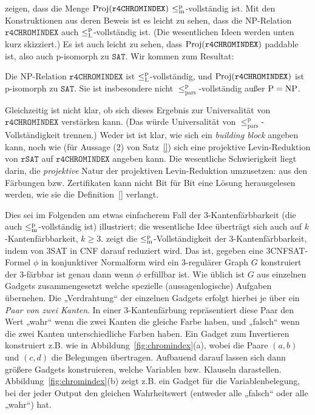\textcite{leven_np_1983} zeigen, dass die Menge $\operatorname{Proj}(\mathtt{r4CHROMINDEX})$ $\leq_\mathrm{m}^\mathrm{p}$-vollständig ist. 
Mit den Konstruktionen aus deren Beweis ist es leicht zu sehen, dass die NP-Relation $\mathtt{r4CHROMINDEX}$ auch $\leq_\mathrm{L}^\mathrm{p}$-vollständig ist. (Die wesentlichen Ideen werden unten kurz skizziert.)
Es ist auch leicht zu sehen, dass $\operatorname{Proj}(\mathtt{r4CHROMINDEX})$ paddable ist, also  auch p-isomorph zu $\mathtt{SAT}$.
Wir kommen zum Resultat:
\begin{observation}
    Die NP-Relation $\mathtt{r4CHROMINDEX}$ ist $\leq_\mathrm{L}^\mathrm{p}$-vollständig, und $\operatorname{Proj}(\mathtt{r4CHROMINDEX})$ ist p-isomorph zu $\mathtt{SAT}$.
    Sie ist insbesondere nicht $\leq_\mathrm{pars}^\mathrm p$-vollständig außer $\mathrm{P}=\mathrm{NP}$.
\end{observation}

Gleichzeitig ist nicht klar, ob sich dieses Ergebnis zur Universalität von $\mathtt{r4CHROMINDEX}$ verstärken kann. (Das würde Universalität von $\leq_\mathrm{pars}^\mathrm p$-Vollständigkeit trennen.) Weder ist ist klar, wie sich ein \emph{building block} angeben kann, noch wie (für Aussage (2) von Satz~\ref{}) sich eine projektive Levin-Reduktion von $\mathtt{rSAT}$ auf $\mathtt{r4CHROMINDEX}$ angeben kann. Die wesentliche Schwierigkeit liegt darin, die \emph{projektive} Natur der projektiven Levin-Reduktion umzusetzen: aus den Färbungen bzw. Zertifikaten kann nicht Bit für Bit eine Lösung herausgelesen werden, wie sie die Definition~\ref{} verlangt.

Dies sei im Folgenden am etwas einfacherem Fall der 3-Kantenfärbbarkeit (die auch $\leq_\mathrm{m}^\mathrm{p}$-vollständig ist) illustriert; die wesentliche Idee überträgt sich auch auf $k$-Kantenfärbbarkeit, $k\geq 3$.
\textcite{holyer_np-completeness_1981} zeigt die $\leq_\mathrm{m}^\mathrm{p}$-Vollständigkeit der 3-Kantenfärbbarkeit, indem von 3SAT in CNF darauf reduziert wird. Das ist, gegeben eine 3CNFSAT-Formel $\phi$ in konjunktiver Normalform wird ein 3-regulärer Graph $G$ konstruiert der 3-färbbar ist genau dann wenn $\phi$ erfüllbar ist. Wie üblich ist $G$ aus einzelnen Gadgets zusammengesetzt welche spezielle (aussagenlogische) Aufgaben übernehen. 
Die „Verdrahtung“ der einzelnen Gadgets erfolgt hierbei je über ein \emph{Paar von zwei Kanten}. In einer 3-Kantenfärbung repräsentiert diese Paar den Wert „wahr“ wenn die zwei Kanten die gleiche Farbe haben, und „falsch“ wenn die zwei Kanten unterschiedliche Farben haben.
Ein Gadget zum Invertieren konstruiert \citeauthor{holyer_np-completeness_1981} z.B. wie in Abbildung~\ref{fig:chromindex}(a), wobei die Paare $(a,b)$ und $(c,d)$ die Belegungen übertragen.
Aufbauend darauf lassen sich dann größere Gadgets konstruieren, welche Variablen bzw. Klauseln darastellen. Abbildung~\ref{fig:chromindex}(b) zeigt z.B. ein Gadget für die Variablenbelegung, bei der jeder Output den gleichen Wahrheitswert (entweder alle „falsch“ oder alle „wahr“) hat.

